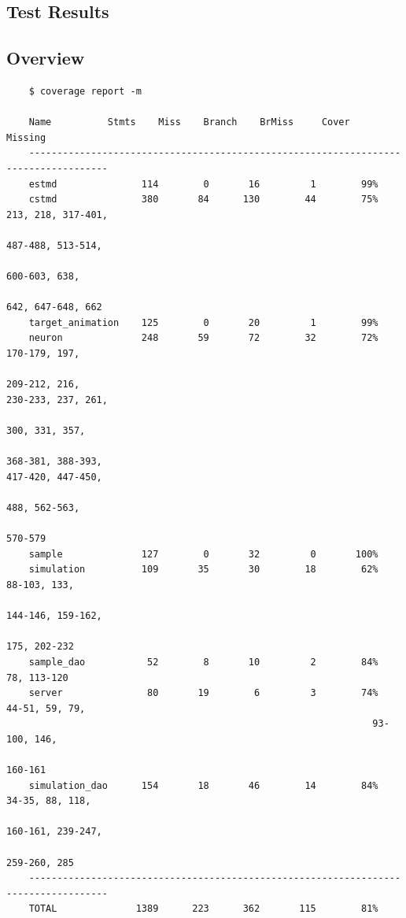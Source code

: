 \documentclass[a4paper,11pt]{article}
\begin{document}
\begin{appendices}
\section{Test Results}
\subsection{Overview}
\vspace*{1em}
\begin{verbatim}
    $ coverage report -m

    Name 	      Stmts    Miss    Branch    BrMiss     Cover   Missing
    ------------------------------------------------------------------------------------
    estmd               114        0       16         1        99%   
    cstmd               380       84      130        44        75%   213, 218, 317-401,
                                                                     487-488, 513-514,
                                                                     600-603, 638,
                                                                     642, 647-648, 662
    target_animation    125        0       20         1        99%   
    neuron              248       59       72        32        72%   170-179, 197,
                                                                     209-212, 216,                                                                                      	                                                                 230-233, 237, 261,
                                                                     300, 331, 357, 
                                                                     368-381, 388-393,                                                                                     	                                                                 417-420, 447-450,
                                                                     488, 562-563,
                                                                     570-579
    sample              127        0       32         0       100%   
    simulation          109       35       30        18        62%   88-103, 133, 
                                                                     144-146, 159-162, 
                                                                     175, 202-232
    sample_dao           52        8       10         2        84%   78, 113-120
    server               80       19        6         3        74%   44-51, 59, 79, 
    	                                                         93-100, 146,
                                                                     160-161
    simulation_dao      154       18       46        14        84%   34-35, 88, 118, 
                                                                     160-161, 239-247,
                                                                     259-260, 285
    ------------------------------------------------------------------------------------
    TOTAL              1389      223      362       115        81%  
    \end{verbatim}


\end{appendices}
\end{document}
